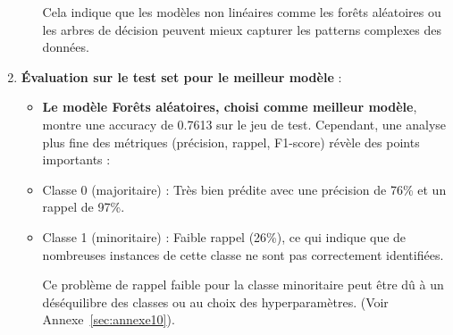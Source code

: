 \begin{enumerate}
\begin{itemize}
Cela indique que les modèles non linéaires comme les forêts aléatoires ou les arbres de décision peuvent mieux capturer les patterns complexes des données.
\end{itemize}

\item \textbf{Évaluation sur le test set pour le meilleur modèle} :
\begin{itemize}
\item \textbf{Le modèle Forêts aléatoires, choisi comme meilleur modèle}, montre une accuracy de 0.7613 sur le jeu de test. Cependant, une analyse plus fine des métriques (précision, rappel, F1-score) révèle des points importants :
\item Classe 0 (majoritaire) : Très bien prédite avec une précision de 76\% et un rappel de 97\%.
\item Classe 1 (minoritaire) : Faible rappel (26\%), ce qui indique que de nombreuses instances de cette classe ne sont pas correctement identifiées.

Ce problème de rappel faible pour la classe minoritaire peut être dû à un déséquilibre des classes ou au choix des hyperparamètres. (Voir Annexe~\ref{sec:annexe10}). 
\end{itemize}
\end{enumerate}

